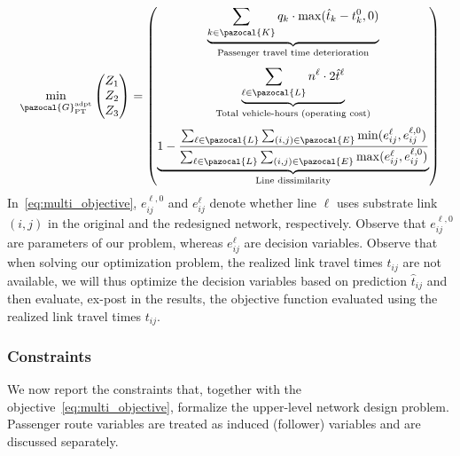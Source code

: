 \documentclass[a4paper,fleqn]{cas-sc}
\begin{document}
\begin{equation}
\label{eq:multi_objective}
\min_{\pazocal{G}_{\text{PT}}^{\text{adpt}}} \begin{pmatrix} Z_1 \\ Z_2 \\ Z_3 \end{pmatrix} = \begin{pmatrix}
\underbrace{\sum_{k \in \pazocal{K}} q_k \cdot \max(\hat{t}_k - t_k^0, 0)}_{\text{Passenger travel time deterioration}} \\[8ex]
\underbrace{\sum_{\ell \in \pazocal{L}} n^\ell \cdot 2\hat{t}^\ell}_{\text{Total vehicle-hours (operating cost)}} \\[8ex]
\underbrace{1 - \frac{\sum_{\ell \in \pazocal{L}} \sum_{(i,j) \in \pazocal{E}} \min(e_{ij}^\ell, e_{ij}^{\ell, 0})}{\sum_{\ell \in \pazocal{L}} \sum_{(i,j) \in \pazocal{E}} \max(e_{ij}^\ell, e_{ij}^{\ell, 0})}}_{\text{Line dissimilarity}}
\end{pmatrix}
\end{equation}
In~\eqref{eq:multi_objective}, $e_{ij}^{\ell, 0}$ and $e_{ij}^\ell$ denote whether line $\ell$ uses substrate link $(i, j)$ in the original and the redesigned network, respectively. Observe that $e_{ij}^{\ell, 0}$ are parameters of our problem, whereas $e_{ij}^\ell$ are decision variables.
%
Observe that when solving our optimization problem, the realized link travel times $t_{ij}$ are not available, we will thus optimize the decision variables based on prediction $\hat{t}_{ij}$ and then evaluate, ex-post in the results, the objective function evaluated using the realized link travel times $t_{ij}$.



\subsubsection{Constraints}
We now report the constraints that, together with the objective~\eqref{eq:multi_objective},
formalize the upper-level network design problem. Passenger route variables are treated as induced (follower) variables and are discussed separately.
\end{document}

